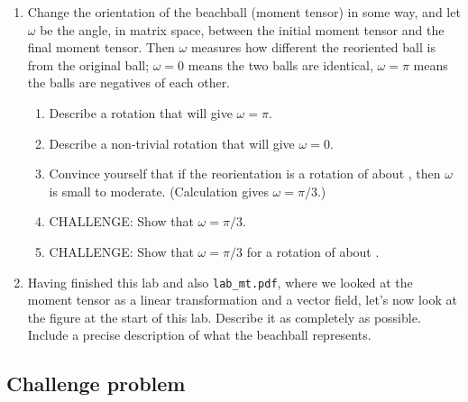 \documentclass[11pt,titlepage,fleqn]{article}
\newcommand{\tvec}{\textcolor{red}{\mbt}}
\newcommand{\bvec}{\textcolor{blue}{\mbb}}
\newcommand{\pvec}{\textcolor{black}{\mbp}}
\newcommand{\nvec}{\mbn}
\newcommand{\svec}{\mbs}
\begin{document}
\begin{enumerate}
\begin{enumerate}
\end{enumerate}


\item Change the orientation of the beachball (moment tensor) in some way, and let $\omega$ be the angle, in matrix space, between the initial moment tensor and the final moment tensor. Then $\omega$ measures how different the reoriented ball is from the original ball; $\omega=0$ means the two balls are identical, $\omega=\pi$ means the balls are negatives of each other.

\begin{enumerate}
\item Describe a rotation that will give $\omega=\pi$.

\item Describe a non-trivial rotation that will give $\omega=0$.

\item Convince yourself that if the reorientation is a rotation of  about \pvec, then $\omega$ is small to moderate. (Calculation gives $\omega=\pi/3$.)

\item CHALLENGE: Show that $\omega=\pi/3$.

\item CHALLENGE: Show that $\omega=\pi/3$ for a rotation of  about \tvec.

\end{enumerate}






\item Having finished this lab and also \verb+lab_mt.pdf+, where we looked at the moment tensor as a linear transformation and a vector field, let's now look at the figure at the start of this lab. Describe it as completely as possible. Include a precise description of what the beachball represents.

\end{enumerate}

\subsection*{Challenge problem}
\end{document}
